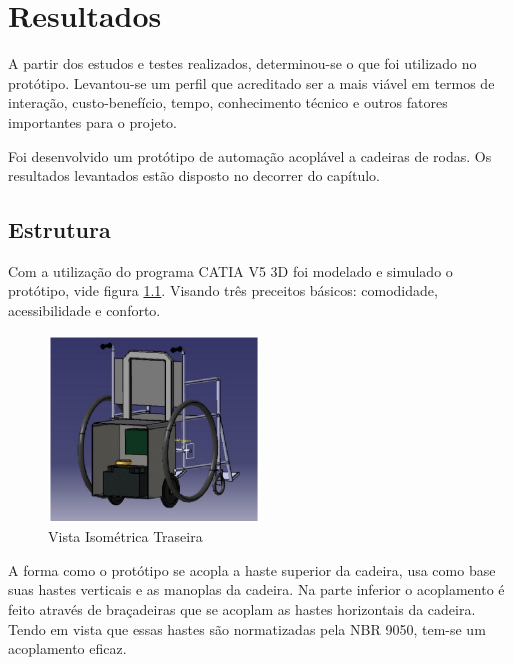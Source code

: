 \chapter[Resultados]{Resultados}

A partir dos estudos e testes realizados, determinou-se o que foi utilizado no protótipo. Levantou-se um perfil que acreditado ser a mais viável em termos de interação, custo-benefício, tempo, conhecimento técnico e outros fatores importantes para o projeto.

Foi desenvolvido um protótipo de automação acoplável a cadeiras de rodas. Os resultados levantados estão disposto no decorrer do capítulo.

\section{Estrutura}

Com a utilização do programa CATIA V5 3D foi modelado e simulado o protótipo, vide figura \ref{fig:vista_isometrica_traseira}. Visando três preceitos básicos: comodidade, acessibilidade e conforto.

\begin{figure}[!htb]
\centering
\includegraphics[width=0.5\textwidth]{figuras/estrutura/vista_isometrica_traseira}
\caption{Vista Isométrica Traseira}
\label{fig:vista_isometrica_traseira}
\end{figure}


A forma como o protótipo se acopla a haste superior da cadeira, usa como base suas hastes verticais e as manoplas da cadeira. Na parte inferior o acoplamento é feito através de braçadeiras que se acoplam as hastes horizontais da cadeira. Tendo em vista que essas hastes são normatizadas pela NBR 9050, tem-se um acoplamento eficaz.

